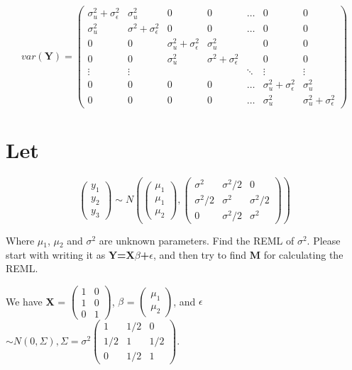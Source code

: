 \documentclass[11pt]{article}
\begin{document}
\[
var(\mathbf{Y}) = \begin{pmatrix} 
\sigma^2_u+\sigma^2_\epsilon & \sigma^2_u & 0 & 0 & \ldots &0 & 0\\
\sigma^2_u & \sigma^2+\sigma^2_\epsilon   & 0 & 0 & \ldots &0 & 0 \\
0 &                            0          & \sigma^2_u+\sigma^2_\epsilon & \sigma^2_u &  & 0 & 0\\
0 &                            0          & \sigma^2_u & \sigma^2+\sigma^2_\epsilon & & 0 & 0\\
\vdots                     & \vdots       &  & & \ddots  &\vdots &\vdots\\
0 &                            0          & 0    & 0 & \ldots & \sigma^2_u+\sigma^2_\epsilon & \sigma^2_u\\
0 &                            0          & 0    & 0 & \ldots & \sigma^2_u                   & \sigma^2_u + \sigma^2_\epsilon
\end{pmatrix}
\]
\section{Let}
\label{sec-2}

$$\begin{pmatrix} y_1 \\ y_2 \\ y_3 \end{pmatrix} \sim N 
\left(\begin{pmatrix} \mu_1 \\ \mu_1 \\ \mu_2 \end{pmatrix},
\begin{pmatrix} \sigma^2 & \sigma^2/2 & 0 \\ \sigma^2/2
& \sigma^2 & \sigma^2/2 \\ 0 & \sigma^2/2 & \sigma^2 \end{pmatrix}
\right)$$ 

Where $\mu$$_1$, $\mu$$_2$ and $\sigma$$^2$ are unknown parameters. 
Find the REML of $\sigma$$^2$. Please start with writing it as \textbf{Y=X$\beta$+$\epsilon$}, and then try to find \textbf{M} for calculating the REML.
 
We have \textbf{X} = $\begin{pmatrix} 1 & 0 \\ 1 & 0 \\ 0 & 1 \end{pmatrix}$, 
\textbf{$\beta$} = $\begin{pmatrix} \mu_1 \\ \mu_2 \end{pmatrix}$, and 
\textbf{$\epsilon$} $\sim N(0,\Sigma),\Sigma=\sigma^2
\begin{pmatrix} 1 & 1/2 & 0 \\ 1/2 & 1 & 1/2 \\ 0 & 1/2 & 1 \end{pmatrix}$.
\end{document}
